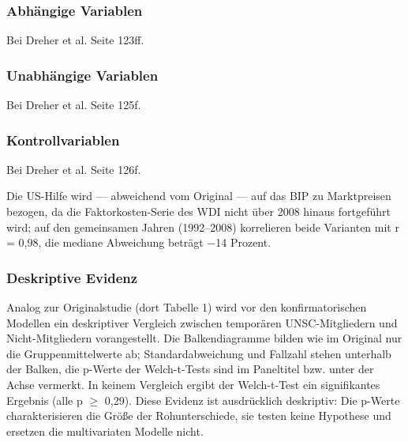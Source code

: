  \subsubsection{Abhängige Variablen}
Bei Dreher et al. Seite 123ff.


  \subsubsection{Unabhängige Variablen}
Bei Dreher et al. Seite 125f.


  \subsubsection{Kontrollvariablen}
Bei Dreher et al. Seite 126f. 

Die US-Hilfe wird — abweichend vom Original — auf das BIP zu Marktpreisen bezogen, da die Faktorkosten-Serie des WDI nicht über 2008 hinaus fortgeführt wird; auf den gemeinsamen Jahren (1992–2008) korrelieren beide Varianten mit r = 0,98, die mediane Abweichung beträgt −14 Prozent.

  \subsubsection{Deskriptive Evidenz}
Analog zur Originalstudie (dort Tabelle 1) wird vor den konfirmatorischen Modellen ein deskriptiver Vergleich zwischen temporären UNSC-Mitgliedern und Nicht-Mitgliedern vorangestellt. Die Balkendiagramme bilden wie im Original nur die Gruppenmittelwerte ab; Standardabweichung und Fallzahl stehen unterhalb der Balken, die p-Werte der Welch-t-Tests sind im Paneltitel bzw. unter der Achse vermerkt. In keinem Vergleich ergibt der Welch-t-Test ein signifikantes Ergebnis (alle p $\geq$ 0{,}29). Diese Evidenz ist ausdrücklich deskriptiv: Die p-Werte charakterisieren die Größe der Rohunterschiede, sie testen keine Hypothese und ersetzen die multivariaten Modelle nicht.


